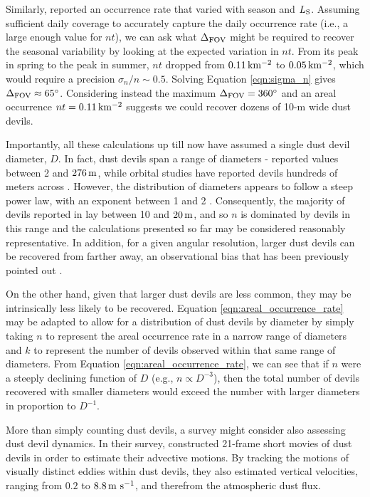 \documentclass{aastex63}
\begin{document}
Similarly, \citet{2006JGRE..11112S09G} reported an occurrence rate that varied with season and $L_{\rm S}$. Assuming sufficient daily coverage to accurately capture the daily occurrence rate (i.e., a large enough value for $n t$), we can ask what $\Delta_{\rm FOV}$ might be required to recover the seasonal variability by looking at the expected variation in $n t$. From its peak in spring to the peak in summer, $n t$ dropped from $0.11\,{\rm km^{-2}}$ to $0.05\,{\rm km^{-2}}$, which would require a precision $\sigma_n/n \sim 0.5$. Solving Equation \ref{eqn:sigma_n} gives $\Delta_{\rm FOV} \approx 65^\circ$. Considering instead the maximum $\Delta_{\rm FOV} = 360^\circ$ and an areal occurrence $nt = 0.11\,{\rm km^{-2}}$ suggests we could recover dozens of 10-m wide dust devils. 

Importantly, all these calculations up till now have assumed a single dust devil diameter, $D$. In fact, dust devils span a range of diameters - \citet{2006JGRE..11112S09G} reported values between 2 and $276\,{\rm m}$, while orbital studies have reported devils hundreds of meters across \citep{2008Icar..197...39S}. However, the distribution of diameters appears to follow a steep power law, with an exponent between 1 and 2 \citep{2016SSRv..203..277L}. Consequently, the majority of devils reported in \citet{2006JGRE..11112S09G} lay between 10 and $20\,{\rm m}$, and so $n$ is dominated by devils in this range and the calculations presented so far may be considered reasonably representative. In addition, for a given angular resolution, larger dust devils can be recovered from farther away, an observational bias that has been previously pointed out \citep{2012Icar..219..556K, 2013Icar..226..964L}.

On the other hand, given that larger dust devils are less common, they may be intrinsically less likely to be recovered. Equation \ref{eqn:areal_occurrence_rate} may be adapted to allow for a distribution of dust devils by diameter by simply taking $n$ to represent the areal occurrence rate in a narrow range of diameters and $k$ to represent the number of devils observed within that same range of diameters. From Equation \ref{eqn:areal_occurrence_rate}, we can see that if $n$ were a steeply declining function of $D$ (e.g., $n \propto D^{-3}$), then the total number of devils recovered with smaller diameters would exceed the number with larger diameters in proportion to $D^{-1}$.

More than simply counting dust devils, a survey might consider also assessing dust devil dynamics. In their survey, \citet{2006JGRE..11112S09G} constructed 21-frame short movies of dust devils in order to estimate their advective motions. By tracking the motions of visually distinct eddies within dust devils, they also estimated vertical velocities, ranging from $0.2$ to $8.8\,{\rm m\ s^{-1}}$, and therefrom the atmospheric dust flux. 
\end{document}
